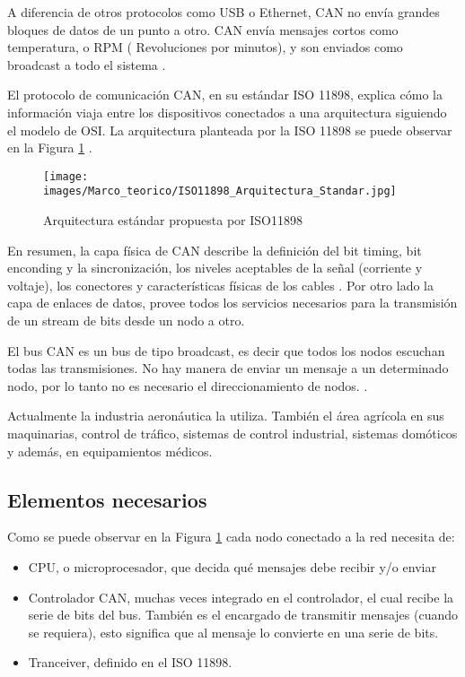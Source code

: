 A diferencia de otros protocolos como USB o Ethernet, CAN no envía grandes bloques de datos de un punto a otro. CAN envía mensajes cortos como temperatura, o RPM ( Revoluciones por minutos), y son enviados como broadcast a todo el sistema \citep{texasCAN}.

El protocolo de comunicación CAN, en su estándar ISO 11898, explica cómo la información viaja entre los dispositivos
conectados a una arquitectura siguiendo el modelo de OSI. La arquitectura planteada
por la ISO 11898 se puede observar en la Figura \ref{fig:iso11898} \citep{texasCAN}.

\begin{figure}[h]
 \centering
 \texttt{[image: images/Marco\_teorico/ISO11898\_Arquitectura\_Standar.jpg]}
  \caption{Arquitectura estándar propuesta por ISO11898}
\label{fig:iso11898}
\end{figure}

En resumen, la capa física de CAN  describe la definición del bit timing, bit enconding y la sincronización, los niveles aceptables de la señal (corriente y voltaje), los conectores y características físicas de los cables \citep{texasCAN}. Por otro lado la capa de enlaces de datos, provee todos los servicios necesarios para la transmisión de un stream de bits desde un nodo a otro.

El bus CAN es un bus de tipo broadcast, es decir que todos los nodos escuchan todas las transmisiones. No hay manera de enviar un mensaje a un determinado nodo, por lo tanto no es necesario el direccionamiento de nodos. \citep{kvaserWEB}.

Actualmente la industria aeronáutica la utiliza. También el área agrícola en sus maquinarias, control de tráfico, sistemas de control industrial, sistemas domóticos y además, en equipamientos médicos.

\subsection{Elementos necesarios}
Como se puede observar en la Figura \ref{fig:iso11898} cada nodo conectado a la red necesita de:

\begin{itemize}
\item \ac{CPU}, o microprocesador, que decida qué mensajes debe recibir y/o enviar
\item Controlador CAN, muchas veces integrado en el controlador, el cual recibe la serie de bits del bus. También es el encargado de transmitir mensajes (cuando se requiera), esto significa que al mensaje lo convierte en una serie de bits.
  \item Tranceiver, definido en el ISO 11898.
\end{itemize}


